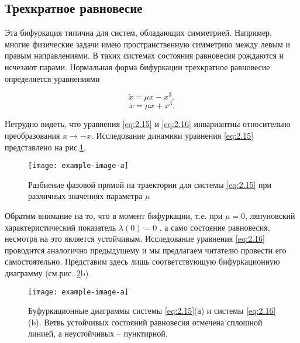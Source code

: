 \subsection{Трехкратное равновесие} %

Эта бифуркация типична для систем, обладающих симметрией.
Например, многие физические задачи имею пространственную симметрию
между левым и правым направлениями. В таких системах состояния
равновесия рождаются и исчезают парами. Нормальная форма бифуркации
трехкратное равновесие определяется уравнениями

\begin{equation}
	\label{eq:2.15}
	\dot x = \mu x - x^3,
\end{equation}
\begin{equation}
	\label{eq:2.16}
	\dot x = \mu x + x^3. 
\end{equation}

Нетрудно видеть, что уравнения \eqref{eq:2.15} и \eqref{eq:2.16} инвариантны относительно
преобразования $x \rightarrow -x$. Исследование динамики уравнения \eqref{eq:2.15} представлено
на рис.\ref{fig:2.9}.

\begin{figure}[h!]
	\centering
	\texttt{[image: example-image-a]}
	\caption{Разбиение фазовой прямой на траектории для системы \eqref{eq:2.15} при различных значениях параметра $\mu$}
	\label{fig:2.9}
\end{figure}


Обратим внимание на то, что в момент бифуркации, т.е. при $\mu=0$, ляпуновский характеристический показатель $\lambda(0) = 0$ , а само состояние равновесия, несмотря на это является устойчивым. Исследование уравнения \eqref{eq:2.16} проводится аналогично предыдущему и мы предлагаем читателю провести его самостоятельно. Представим здесь лишь соответствующую бифуркационную диаграмму (см.рис. \ref{fig:2.10}b).
\begin{figure}[h!]
    \centering
    \texttt{[image: example-image-a]}
    \caption{Буфуркационные диаграммы системы \eqref{eq:2.15}(а) и системы \eqref{eq:2.16}(b).
    Ветвь устойчивых состояний равновесия отмечена сплошной линией, а неустойчивых -- пунктирной.}
    \label{fig:2.10}
\end{figure}
